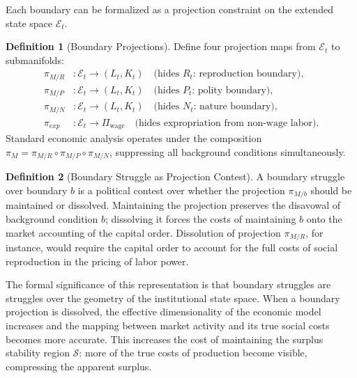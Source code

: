 \documentclass[12pt,a4paper]{article}
\theoremstyle{definition}
\newtheorem{definition}{Definition}[section]
\theoremstyle{remark}
\begin{document}
Each boundary can be formalized as a projection constraint on the extended state space $\mathcal{E}_t$.

\begin{definition}[Boundary Projections]
Define four projection maps from $\mathcal{E}_t$ to submanifolds:
\begin{align}
  \pi_{M/R} &: \mathcal{E}_t \to (L_t, K_t) \quad \text{(hides }R_t\text{: reproduction boundary)}, \\
  \pi_{M/P} &: \mathcal{E}_t \to (L_t, K_t) \quad \text{(hides }P_t\text{: polity boundary)}, \\
  \pi_{M/N} &: \mathcal{E}_t \to (L_t, K_t) \quad \text{(hides }N_t\text{: nature boundary)}, \\
  \pi_{exp} &: \mathcal{E}_t \to \Pi_{\mathrm{wage}} \quad \text{(hides expropriation from non-wage labor)}.
\end{align}
Standard economic analysis operates under the composition $\pi_M = \pi_{M/R} \circ \pi_{M/P} \circ \pi_{M/N}$, suppressing all background conditions simultaneously.
\end{definition}

\begin{definition}[Boundary Struggle as Projection Contest]
A boundary struggle over boundary $b$ is a political contest over whether the projection $\pi_{M/b}$ should be maintained or dissolved. Maintaining the projection preserves the disavowal of background condition $b$; dissolving it forces the costs of maintaining $b$ onto the market accounting of the capital order. Dissolution of projection $\pi_{M/R}$, for instance, would require the capital order to account for the full costs of social reproduction in the pricing of labor power.
\end{definition}

The formal significance of this representation is that boundary struggles are struggles over the geometry of the institutional state space. When a boundary projection is dissolved, the effective dimensionality of the economic model increases and the mapping between market activity and its true social costs becomes more accurate. This increases the cost of maintaining the surplus stability region $\mathcal{S}$: more of the true costs of production become visible, compressing the apparent surplus.
\end{document}
